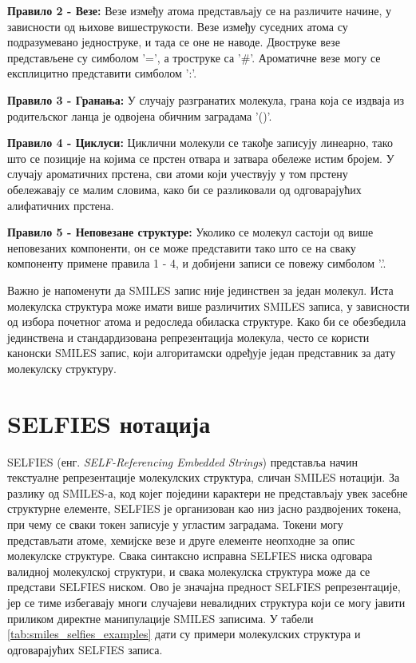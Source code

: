 \documentclass[12pt,oneside]{memoir}
\begin{document}
\textbf{Правило 2 - Везе:} Везе између атома представљају се на различите начине, у зависности од њихове вишеструкости. Везе између суседних атома су подразумевано једноструке, и тада се оне не наводе. Двоструке везе представљене су симболом '=', а троструке са '\#'. Ароматичне везе могу се експлицитно представити симболом ':'.

\textbf{Правило 3 - Гранања:} У случају разгранатих молекула, грана која се издваја из родитељског ланца је одвојена обичним заградама '()'.

\textbf{Правило 4 - Циклуси:} Циклични молекули се такође записују линеарно, тако што се позиције на којима се прстен отвара и затвара обележе истим бројем. У случају ароматичних прстена, сви атоми који учествују у том прстену обележавају се малим словима, како би се разликовали од одговарајућих алифатичних прстена.

\textbf{Правило 5 - Неповезане структуре:} Уколико се молекул састоји од више неповезаних компоненти, он се може представити тако што се на сваку компоненту примене правила 1 - 4, и добијени записи се повежу симболом '.'.

Важно је напоменути да SMILES запис није јединствен за један молекул. Иста молекулска структура може имати више различитих SMILES записа, у зависности од избора почетног атома и редоследа обиласка структуре. Како би се обезбедила јединствена и стандардизована репрезентација молекула, често се користи канонски SMILES запис, који алгоритамски одређује један представник за дату молекулску структуру.

\section{SELFIES нотација}
\label{chp:selfies}

SELFIES (енг. \textit{SELF-Referencing Embedded Strings}) 
\cite{Krenn_2020} представља начин текстуалне репрезентације 
молекулских структура, сличан SMILES нотацији. За разлику од 
SMILES-а, код којег поједини карактери не представљају увек 
засебне структурне елементе, SELFIES је организован као низ 
јасно раздвојених токена, при чему се 
сваки токен записује у угластим заградама. Токени могу 
представљати атоме, хемијске везе и друге елементе неопходне 
за опис молекулске структуре. Свака синтаксно исправна SELFIES ниска одговара валидној 
молекулској структури, и свака молекулска структура може да се представи 
SELFIES ниском. Ово је значајна предност SELFIES репрезентације, 
јер се тиме избегавају многи случајеви
невалидних структура који се могу јавити приликом директне
манипулације SMILES записима. У табели \ref{tab:smiles_selfies_examples} дати су примери 
молекулских структура и одговарајућих SELFIES записа.
\end{document}
